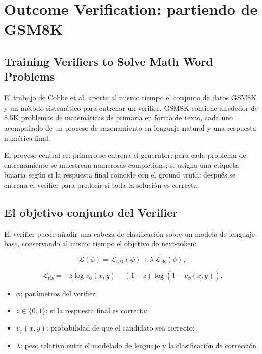 \section{Outcome Verification: partiendo de GSM8K}

\subsection{Training Verifiers to Solve Math Word Problems}

El trabajo de Cobbe et al. aporta al mismo tiempo el conjunto de datos GSM8K y un método sistemático para entrenar un verifier. GSM8K contiene alrededor de 8.5K problemas de matemáticas de primaria en forma de texto, cada uno acompañado de un proceso de razonamiento en lenguaje natural y una respuesta numérica final.


El proceso central es: primero se entrena el generator; para cada problema de entrenamiento se muestrean numerosas completions; se asigna una etiqueta binaria según si la respuesta final coincide con el ground truth; después se entrena el verifier para predecir si toda la solución es correcta.


\subsection{El objetivo conjunto del Verifier}

El verifier puede añadir una cabeza de clasificación sobre un modelo de lenguaje base, conservando al mismo tiempo el objetivo de next-token:

$$
\mathcal L(\phi)
=\mathcal L_{\mathrm{LM}}(\phi)
+\lambda\,\mathcal L_{\mathrm{cls}}(\phi),
$$

$$
\mathcal L_{\mathrm{cls}}
=-z\log v_{\phi}(x,y)-(1-z)\log(1-v_{\phi}(x,y)).
$$

\begin{itemize}
    \item $\phi$: parámetros del verifier;
    \item $z\in\{0,1\}$: si la respuesta final es correcta;
    \item $v_{\phi}(x,y)$: probabilidad de que el candidato sea correcto;
    \item $\lambda$: peso relativo entre el modelado de lenguaje y la clasificación de corrección.
\end{itemize}


